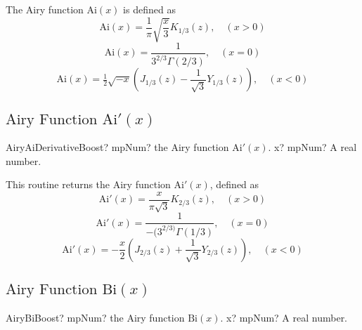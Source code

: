 \vspace{0.3cm}
The Airy function $\text{Ai}(x)$ is defined as
\begin{equation}
	\text{Ai}(x) = \frac{1}{\pi} \sqrt{\frac{x}{3}} K_{1/3}(z), \quad (x>0)
\end{equation}
\begin{equation}
	\text{Ai}(x) = \frac{1}{3^{2/3}\Gamma(2/3)} , \quad (x=0)
\end{equation}
\begin{equation}
	\text{Ai}(x) = \tfrac{1}{2} \sqrt{-x} \left(J_{1/3}(z) - \frac{1}{\sqrt{3}} Y_{1/3}(z) \right), \quad (x<0)
\end{equation}




\subsection{\texorpdfstring{$\text{Airy Function Ai}'(x)$}{AiPx}}

\begin{mpFunctionsExtract}
	\mpFunctionOne
	{AiryAiDerivativeBoost? mpNum? the Airy function $\text{Ai}'(x)$.}
	{x? mpNum? A real number.}
\end{mpFunctionsExtract}

\vspace{0.3cm}
This routine returns the Airy function $\text{Ai}'(x)$, defined as
\begin{equation}
	\text{Ai}'(x) = \frac{x}{\pi\sqrt{3}}  K_{2/3}(z), \quad (x>0)
\end{equation}
\begin{equation}
	\text{Ai}'(x) = \frac{1}{-(3^{2/3)}\Gamma(1/3)} , \quad (x=0)
\end{equation}
\begin{equation}
	\text{Ai}'(x) = -\frac{x}{2} \left(J_{2/3}(z) + \frac{1}{\sqrt{3}} Y_{2/3}(z) \right), \quad (x<0)
\end{equation}




\subsection{\texorpdfstring{$\text{Airy Function Bi}(x)$}{Bix}}

\begin{mpFunctionsExtract}
	\mpFunctionOne
	{AiryBiBoost? mpNum? the Airy function $\text{Bi}(x)$.}
	{x? mpNum? A real number.}
\end{mpFunctionsExtract}

